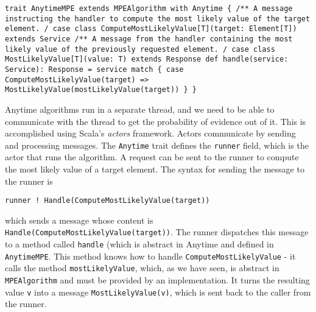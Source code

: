 \begin{flushleft}
\texttt{trait AnytimeMPE extends MPEAlgorithm with Anytime \{
\newline \tab /**
\newline \tab * A message instructing the handler to compute the most likely
value of the target element.
\newline \tab */
\newline \tab case class ComputeMostLikelyValue[T](target: Element[T]) extends
Service
\newline 
\newline \tab /**
\newline \tab * A message from the handler containing the most likely value of the previously requested element.
\newline \tab */
\newline 
\newline \tab case class MostLikelyValue[T](value: T) extends Response
\newline 
\newline \tab def handle(service: Service): Response =
\newline \tab service match \{
\newline \tab case ComputeMostLikelyValue(target) =>
\newline \tab MostLikelyValue(mostLikelyValue(target))
\newline \}
\newline \}
}
\end{flushleft}

Anytime algorithms run in a separate thread, and we need to be able to communicate with the thread to get the probability of evidence out of it. This is accomplished using Scala's \emph{actors} framework.  Actors communicate by sending and processing messages. The \texttt{Anytime} trait defines the \texttt{runner} field, which is the actor that runs the algorithm. A request can be sent to the runner to compute the most likely value of a target element. The syntax for sending the message to the runner is

\begin{flushleft}
\texttt{runner ! Handle(ComputeMostLikelyValue(target))}
\end{flushleft}

which sends a message whose content is \texttt{Handle(ComputeMostLikely\-Value(target))}. The runner dispatches this message to a method called \texttt{handle} (which is abstract in Anytime and defined in \texttt{AnytimeMPE}. This method knows how to handle \texttt{ComputeMostLikelyValue} - it calls the method \texttt{mostLike\-lyValue}, which, as we have seen, is abstract in \texttt{MPEAlgorithm} and must be provided by an implementation. It turns the resulting value \texttt{v} into a message \texttt{MostLikelyValue(v)}, which is sent back to the caller from the runner.

